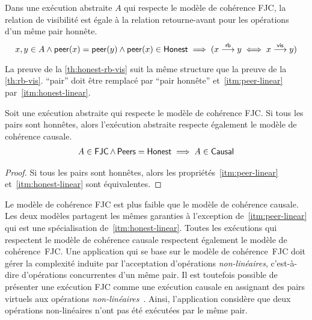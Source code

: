 \begin{proposition}\label{th:honest-rb-vis}
Dans une exécution abstraite $A$ qui respecte le modèle de cohérence \ac{FJC}, la relation de visibilité est égale à la relation retourne-avant pour les opérations d'un même pair honnête.
\begin{equation*}
    x, y \in A \land \operatorname{\mathsf{peer}}(x) = \operatorname{\mathsf{peer}}(y) \land \operatorname{\mathsf{peer}}(x) \in \operatorname{\mathsf{Honest}} \implies (x \overset{\mathsf{rb}}{\longrightarrow} y \iff x \overset{\mathsf{vis}}{\longrightarrow} y)
\end{equation*}
\end{proposition}

La preuve de la \autoref{th:honest-rb-vis} suit la même structure que la preuve de la \autoref{th:rb-vis}.
\enquote{pair} doit être remplacé par \enquote{pair honnête} et~\ref{itm:peer-linear} par~\ref{itm:honest-linear}.

\begin{proposition}\label{th:causal-fjc}
Soit une exécution abstraite qui respecte le modèle de cohérence \ac{FJC}.
Si tous les pairs sont honnêtes, alors l'exécution abstraite respecte également le modèle de cohérence causale.
\begin{equation*}\begin{split}
    A \in \operatorname{\mathsf{FJC}} \land \operatorname{\mathsf{Peers}} = \operatorname{\mathsf{Honest}} \implies A \in \operatorname{\mathsf{Causal}}
\end{split}\end{equation*}
\end{proposition}

\begin{proof}
Si tous les pairs sont honnêtes, alors les propriétés~\ref{itm:peer-linear} et~\ref{itm:honest-linear} sont équivalentes.
\end{proof}

Le modèle de cohérence \ac{FJC} est plus faible que le modèle de cohérence causale.
Les deux modèles partagent les mêmes garanties à l'exception de~\ref{itm:peer-linear} qui est une spécialisation de~\ref{itm:honest-linear}.
Toutes les exécutions qui respectent le modèle de cohérence causale respectent également le modèle de cohérence~\ac{FJC}.
Une application qui se base sur le modèle de cohérence~\ac{FJC} doit gérer la complexité induite par l'acceptation d'opérations \emph{non-linéaires}, c'est-à-dire d'opérations concurrentes d'un même pair.
Il est toutefois possible de présenter une exécution \ac{FJC} comme une exécution causale en assignant des pairs virtuels aux opérations \emph{non-linéaires}~\autocite{mahajan_depot_2011}.
Ainsi, l'application considère que deux opérations non-linéaires n'ont pas été exécutées par le même pair.


